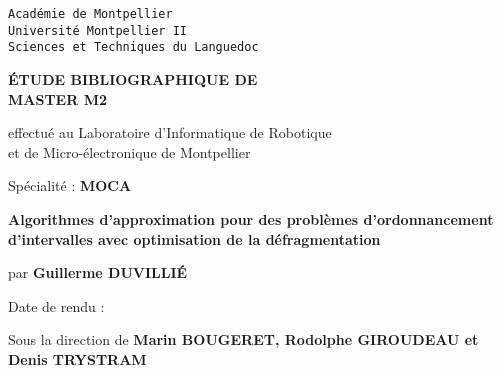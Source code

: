 \pagestyle{fancyplain}
\thispagestyle{empty}
\noindent
\begin{center}
\large{\texttt{Académie de Montpellier}}\\
\Large{\texttt{Université Montpellier II}}\\
\large{\texttt{Sciences et Techniques du Languedoc}}\\
\end{center}

\vspace{1cm}

\begin{center}
\Huge{\textbf{\'{E}TUDE BIBLIOGRAPHIQUE DE\\}}
 \vspace{1.0cm}
\Huge{\textbf{MASTER M2}}
\normalsize
\begin{center}
\vspace{1.0cm}

effectué au Laboratoire d'Informatique de Robotique\\
et de Micro-électronique de Montpellier
\end{center}

\vspace{2mm}

\vspace{0.1cm}
\normalsize

\vspace{3mm}

\large{Spécialité} : \textbf{MOCA}\\
\vspace{1.0cm}

\LARGE{\textbf{Algorithmes d'approximation pour des problèmes d'ordonnancement d'intervalles
avec optimisation de la défragmentation}}
\vspace{2mm}

\begin{center}
  par \textbf{Guillerme DUVILLIÉ}
\end{center}

\vspace{2mm}



\vspace{4cm}

Date de rendu : \textbf{}

\vspace{0.5cm}

Sous la direction de \textbf{Marin BOUGERET, Rodolphe GIROUDEAU et Denis TRYSTRAM}

\vspace{5mm}




\end{center}
\newpage
